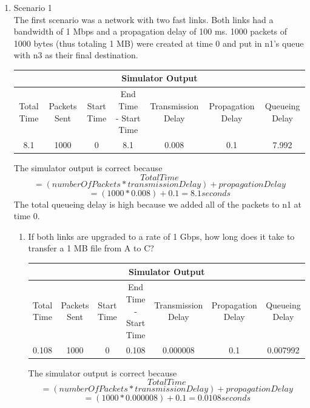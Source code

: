 \documentclass[11pt]{article}
\begin{document}
\begin{enumerate}
\item Scenario 1 \hfill \\
The first scenario was a network with two fast links. Both links had a bandwidth of 1 Mbps and a propagation delay of 100 ms. 1000 packets of 1000 bytes (thus totaling 1 MB) were created at time 0 and put in n1's queue with n3 as their final destination.
\begin{center}
\begin{tabular}{ c c c c c c c }
  \multicolumn{7}{c}{Simulator Output} \\
  \hline
  {\tiny Total Time} & {\tiny Packets Sent} & {\tiny Start Time} & {\tiny End Time - Start Time} & {\tiny Transmission Delay} & {\tiny Propagation Delay} & {\tiny Queueing Delay}\\
  8.1 & 1000 & 0 & 8.1 & 0.008 & 0.1 & 7.992 \\
\end{tabular}
\end{center}
The simulator output is correct because
$$Total Time$$
$$= (numberOfPackets * transmissionDelay) + propagationDelay$$
$$= (1000*0.008) + 0.1 = 8.1 seconds$$
The total queueing delay is high because we added all of the packets to n1 at time 0.

\begin{enumerate}
    \item If both links are upgraded to a rate of 1 Gbps, how long does it take to transfer a 1 MB file from A to C?
    \begin{center}
    \begin{tabular}{ c c c c c c c }
      \multicolumn{7}{c}{Simulator Output} \\
      \hline
      {\tiny Total Time} & {\tiny Packets Sent} & {\tiny Start Time} & {\tiny End Time - Start Time} & {\tiny Transmission Delay} & {\tiny Propagation Delay} & {\tiny Queueing Delay}\\
      0.108 & 1000 & 0 & 0.108 & 0.000008 & 0.1 & 0.007992 \\
    \end{tabular}
    \end{center}
    The simulator output is correct because
    $$Total Time$$
    $$= (numberOfPackets * transmissionDelay) + propagationDelay$$
    $$= (1000*0.000008) + 0.1 = 0.0108 seconds$$
\end{enumerate}


\end{enumerate}
\end{document}
